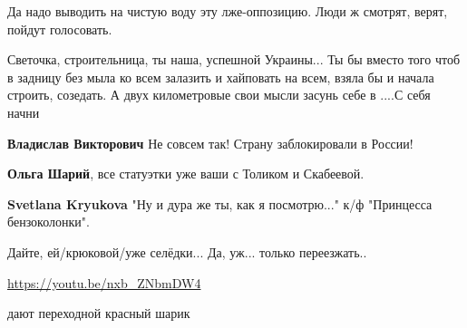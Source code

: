 \begin{itemize}
\begin{itemize}
Да надо выводить на чистую воду эту лже-оппозицию. Люди ж смотрят, верят, пойдут голосовать.

 

Светочка, строительница, ты наша, успешной Украины... Ты бы вместо того чтоб в
задницу без мыла ко всем залазить и хайповать на всем, взяла бы и начала
строить, созедать. А двух километровые свои мысли засунь себе в ....С себя
начни

 
\textbf{Владислав Викторович} Не совсем так! Страну заблокировали в России!

 
\textbf{Ольга Шарий}, все статуэтки уже ваши с Толиком и Скабеевой.

 
\textbf{Svetlana Kryukova} "Ну и дура же ты, как я посмотрю..." к/ф "Принцесса бензоколонки".

 

Дайте, ей/крюковой/уже селёдки...
Да, уж... только переезжать..

\url{https://youtu.be/nxb_ZNbmDW4}

 
дают переходной красный шарик


\end{itemize}
\end{itemize}
